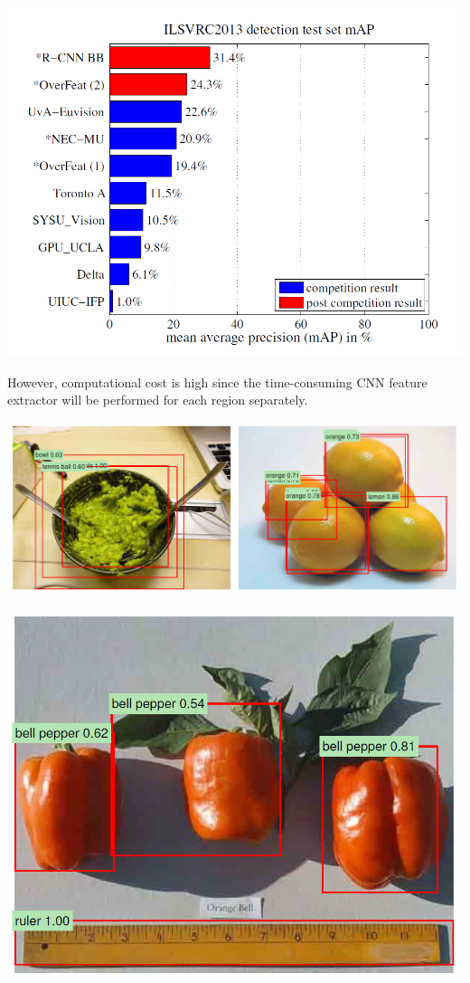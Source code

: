 \begin{frame}[allowframebreaks]
\framebreak

\begin{center}
	\includegraphics[scale=0.6]{figs/mAP_RCNN}
\end{center}
However, computational cost is high since the time-consuming CNN feature extractor will be performed for each region separately.


\framebreak



\begin{center}
	\includegraphics[scale=0.5]{figs/RCNN_bad_classification}
\end{center}

\begin{center}
	\includegraphics[scale=0.6]{figs/RCNN_right_classification}
\end{center}


\end{frame}
